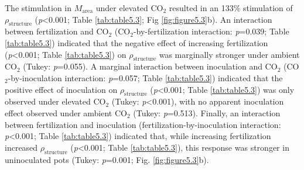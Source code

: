 The stimulation in $M_\mathrm{area}$ under elevated CO$_2$ resulted in an 133\% stimulation of $\rho_\mathrm{structure}$ (\textit{p}<0.001; Table \ref{tab:table5.3}; Fig \ref{fig:figure5.3}b). An interaction between fertilization and CO$_2$ (CO$_2$-by-fertilization interaction: \textit{p}=0.039; Table \ref{tab:table5.3}) indicated that the negative effect of increasing fertilization (\textit{p}<0.001; Table \ref{tab:table5.3}) on $\rho_\mathrm{structure}$ was marginally stronger under ambient CO$_2$ (Tukey: \textit{p}=0.055). A marginal interaction between inoculation and CO$_2$ (CO$_2$-by-inoculation interaction: \textit{p}=0.057; Table \ref{tab:table5.3}) indicated that the positive effect of inoculation on $\rho_\mathrm{structure}$ (\textit{p}<0.001; Table \ref{tab:table5.3}) was only observed under elevated CO$_2$ (Tukey: \textit{p}<0.001), with no apparent inoculation effect observed under ambient CO$_2$ (Tukey: \textit{p}=0.513). Finally, an interaction between fertilization and inoculation (fertilization-by-inoculation interaction: \textit{p}<0.001; Table \ref{tab:table5.3}) indicated that, while increasing fertilization increased $\rho_\mathrm{structure}$ (\textit{p}<0.001; Table \ref{tab:table5.3}), this response was stronger in uninoculated pots (Tukey: \textit{p}=0.001; Fig. \ref{fig:figure5.3}b).

